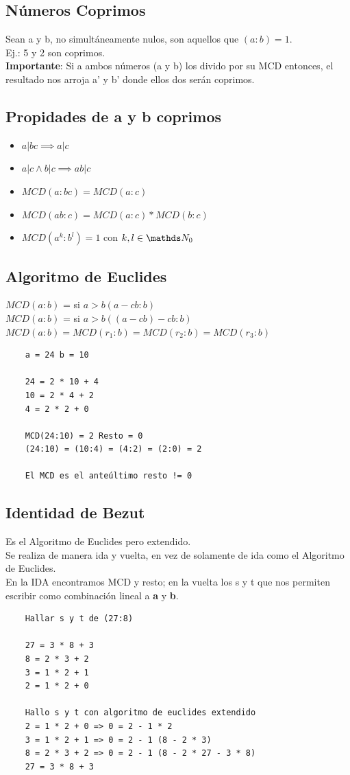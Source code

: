 \documentclass[10pt,a4paper]{article}
\begin{document}
\subsection*{Números Coprimos}
Sean a y b, no simultáneamente nulos, son aquellos que $(a:b)=1$. \\
Ej.: 5 y 2 son coprimos. \\
\textbf{Importante}: Si a ambos números (a y b) los divido por su MCD entonces, el resultado nos arroja a' y b' donde ellos dos serán coprimos.
\subsection*{Propidades de a y b coprimos}
\begin{itemize}
    \item $a | bc \implies a | c$
    \item $a | c \land b | c \implies ab | c$ 
    \item $MCD(a:bc) = MCD(a:c)$
    \item $MCD(ab:c) = MCD(a:c) * MCD(b:c)$
    \item $MCD(a^{k}:b^{l}) = 1$ con $k, l \in \nat_{0}$
\end{itemize}
\subsection*{Algoritmo de Euclides}
$MCD(a:b)$ = si $a>b (a-cb:b)$ \\
$MCD(a:b)$ = si $a > b ((a-cb)-cb:b)$ \\
$MCD(a:b) = MCD(r_{1}:b) = MCD(r_{2}:b) = MCD(r_{3}:b)$
\begin{lstlisting}
    a = 24 b = 10

    24 = 2 * 10 + 4
    10 = 2 * 4 + 2
    4 = 2 * 2 + 0

    MCD(24:10) = 2 Resto = 0
    (24:10) = (10:4) = (4:2) = (2:0) = 2

    El MCD es el anteúltimo resto != 0
\end{lstlisting}
\subsection*{Identidad de Bezut}
Es el Algoritmo de Euclides pero extendido. \\
Se realiza de manera ida y vuelta, en vez de solamente de ida como el Algoritmo de Euclides. \\
En la IDA encontramos MCD y resto; en la vuelta los s y t que nos permiten escribir como combinación lineal a \textbf{a} y \textbf{b}. \\
\begin{lstlisting}
    Hallar s y t de (27:8)

    27 = 3 * 8 + 3 
    8 = 2 * 3 + 2
    3 = 1 * 2 + 1
    2 = 1 * 2 + 0

    Hallo s y t con algoritmo de euclides extendido 
    2 = 1 * 2 + 0 => 0 = 2 - 1 * 2
    3 = 1 * 2 + 1 => 0 = 2 - 1 (8 - 2 * 3)
    8 = 2 * 3 + 2 => 0 = 2 - 1 (8 - 2 * 27 - 3 * 8)
    27 = 3 * 8 + 3 
\end{lstlisting}
\end{document}
